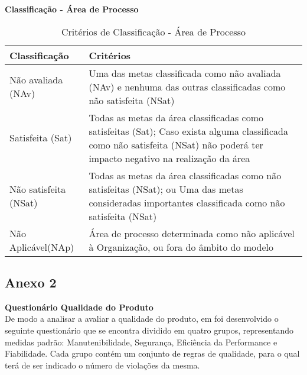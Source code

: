 \documentclass[openany,10pt,a4paper]{article}
\begin{document}
\begin{appendix}
\begin{table}[h]
	\textbf{Classificação - Área de Processo}
		\centering
		\caption{Critérios de Classificação - Área de Processo}
		\begin{tabular}{p{5in}p{1in}}		
			\toprule
			\textbf{Classificação}  & \textbf{Critérios}\\ 
			\midrule
			Não avaliada (NAv) & Uma das metas classificada como não avaliada (NAv) e nenhuma das
			outras classificadas como não satisfeita (NSat) \\
			\midrule
			Satisfeita (Sat) & Todas as metas da área classificadas como satisfeitas (Sat);
			Caso exista alguma classificada como não satisfeita (NSat) não poderá
			ter impacto negativo na realização da área \\
			\midrule
			Não satisfeita (NSat) & Todas as metas da área classificadas como não satisfeitas (NSat); ou
			Uma das metas consideradas importantes classificada como não
			satisfeita (NSat) \\
			\midrule
			Não Aplicável(NAp) & Área de processo determinada como não aplicável à Organização, ou
			fora do âmbito do modelo \\
			\bottomrule
		\end{tabular} 
\end{table}


\subsection{Anexo 2}
\textbf{Questionário Qualidade do Produto}\\
De modo a analisar a avaliar a qualidade do produto, em foi desenvolvido o seguinte questionário que se encontra dividido em quatro grupos, representando medidas padrão: Manutenibilidade, Segurança, Eficiência da Performance e Fiabilidade.
Cada grupo contém um conjunto de regras de qualidade, para o qual terá de ser indicado o número de violações da mesma.


\end{appendix}
\end{document}

